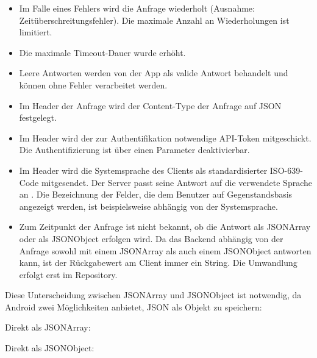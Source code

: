 \begin{itemize}
\tightlist
\item
  Im Falle eines Fehlers wird die Anfrage wiederholt (Ausnahme:
  Zeitüberschreitungsfehler). Die maximale Anzahl an Wiederholungen ist
  limitiert.
\item
  Die maximale Timeout-Dauer wurde erhöht.
\item
  Leere Antworten werden von der App als valide Antwort behandelt und
  können ohne Fehler verarbeitet werden.
\item
  Im Header der Anfrage wird der Content-Type der Anfrage auf JSON
  festgelegt.
\item
  Im Header wird der zur Authentifikation notwendige API-Token
  mitgeschickt. Die Authentifizierung ist über einen Parameter
  deaktivierbar.
\item
  Im Header wird die Systemsprache des Clients als standardisierter
  ISO-639-Code mitgesendet. Der Server passt seine Antwort auf die
  verwendete Sprache an \cite{ISO-639}. Die Bezeichnung der Felder, die
  dem Benutzer auf Gegenstandsbasis angezeigt werden, ist beispielsweise
  abhängig von der Systemsprache.
\item
  Zum Zeitpunkt der Anfrage ist nicht bekannt, ob die Antwort als
  JSONArray oder als JSONObject erfolgen wird. Da das Backend abhängig
  von der Anfrage sowohl mit einem JSONArray als auch einem JSONObject
  antworten kann, ist der Rückgabewert am Client immer ein String. Die
  Umwandlung erfolgt erst im Repository.
\end{itemize}

Diese Unterscheidung zwischen JSONArray und JSONObject ist notwendig, da
Android zwei Möglichkeiten anbietet, JSON als Objekt zu speichern:

Direkt als JSONArray:

\begin{Shaded}
\begin{Highlighting}[]
 
\end{Highlighting}
\end{Shaded}

Direkt als JSONObject:

\begin{Shaded}
\begin{Highlighting}[]
 
\end{Highlighting}
\end{Shaded}

